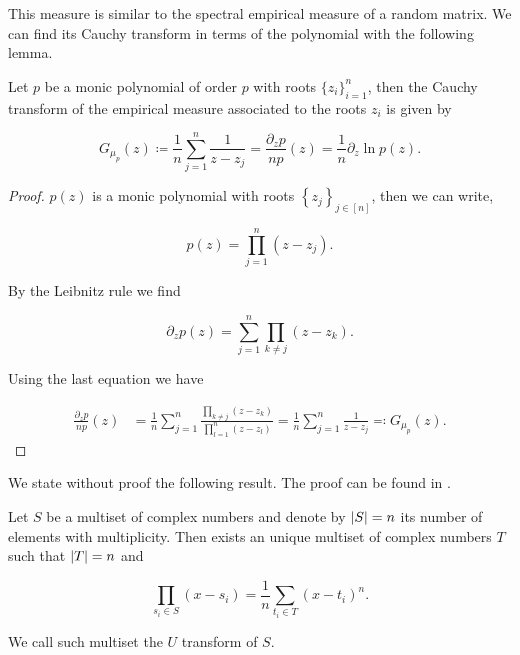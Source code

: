 This measure is similar to the spectral empirical measure of a random matrix. We can find its Cauchy transform in terms of the polynomial with the following lemma.

\begin{lemma} \label{lemma:cauchy_empirical_polynomial}
    Let $p$ be a monic polynomial of order $p$ with roots $\{z_i\}_{i=1}^n$, then the Cauchy transform of the empirical measure associated to the roots $z_i$ is given by 

    \begin{equation*}
        G_{\mu_p}(z) \coloneqq \frac1n \sum_{j=1}^n \frac1{z - z_j} = \frac{\partial_z p }{n p}(z) = \frac1n \partial_z \ln p(z).
    \end{equation*}

\end{lemma}

\begin{proof}
    $p(z)$ is a monic polynomial with roots $\left\{ z_j \right\}_{j \in [n]}$, then we can write,

    \begin{equation*}
        p(z) = \prod_{j=1}^n (z-z_j).
    \end{equation*}

    By the Leibnitz rule we find

    \begin{equation*}
        \partial_z p(z) = \sum_{j=1}^n \prod_{k\neq j} (z-z_k).
    \end{equation*}

    Using the last equation we have

    \begin{align*}
        \frac{\partial_z p}{n p}(z) &= \frac1n\sum_{j=1}^n \frac{\prod_{k\neq j} (z-z_k) }{ \prod_{l=1}^n (z-z_l) } = \frac1n\sum_{j=1}^n \frac{1}{z - z_j} \eqqcolon G_{\mu_p}(z).
    \end{align*}
\end{proof}

We state without proof the following result. The proof  can be found in \cite{anaya2016cumulantes}.

\begin{lemma}[$U$ transform]
    Let $S$ be a multiset of complex numbers and denote by $\lvert S \rvert=n$ its number of elements with multiplicity. Then exists an unique multiset of complex numbers $T$ such that $\lvert T \rvert=n$ and 

    \begin{equation*}
        \prod_{s_i \in S} (x-s_i) = \frac 1n \sum_{t_i \in T} (x-t_i)^n.
    \end{equation*}

    We call such multiset the $U$ transform of $S$.
\end{lemma}

